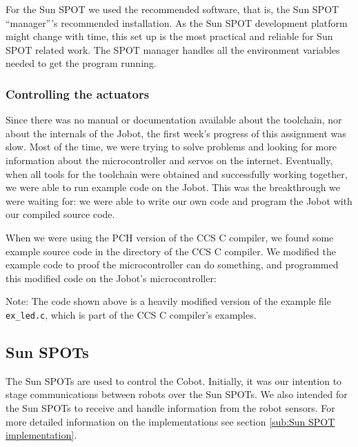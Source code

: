 \documentclass[a4paper,10pt]{article} %
\begin{document}
For the Sun SPOT we used the recommended software, that is, the Sun SPOT
``manager'''s recommended installation. As the Sun SPOT development platform
might change with time, this set up is the most practical and reliable for Sun
SPOT related work. The SPOT manager handles all the environment variables needed
to get the program running.


\subsubsection{Controlling the actuators} %
\label{sub:Controlling the actuators}

Since there was no manual or documentation available about the toolchain, nor
about the internals of the Jobot, the first week's progress of this assignment
was slow. Most of the time, we were trying to solve problems and looking for
more information about the microcontroller and servos on the internet.
Eventually, when all tools for the toolchain were obtained and successfully
working together, we were able to run example code on the Jobot. This was the
breakthrough we were waiting for: we were able to write our own code and program
the Jobot with our compiled source code.

When we were using the PCH version of the CCS C compiler, we found some example
source code in the directory of the CCS C compiler. We modified the example code
to proof the microcontroller can do something, and programmed this modified code
on the Jobot's microcontroller:



\noindent Note: The code shown above is a heavily modified version of the
example file \texttt{ex\_led.c}, which is part of the CCS C compiler's examples.



\subsection{Sun SPOTs} %
\label{sec:sunspot}

The Sun SPOTs are used to control the Cobot. Initially, it was our intention to
stage communications between robots over the Sun SPOTs. We also intended for the
Sun SPOTs to receive and handle information from the robot sensors. For more
detailed information on the implementations see section \ref{sub:Sun SPOT
implementation}.
\end{document}
